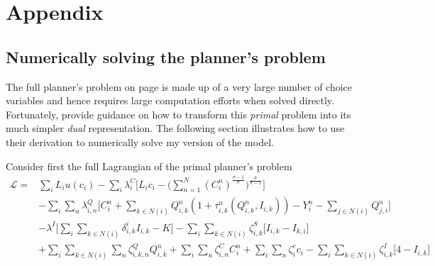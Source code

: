 \documentclass[11pt, oneside]{article}   	%
\begin{document}
  \section*{Appendix}

  \subsection{Numerically solving the planner's problem}
  \label{chapter:APP:math}


The full planner's problem on page \pageref{planner_problem} is made up of a very large number of choice variables and hence requires large computation efforts when solved directly. Fortunately, \cite{fajgelbaum_optimal_2017} provide guidance on how to transform this \emph{primal} problem into its much simpler \emph{dual} representation. The following section illustrates how to use their derivation to numerically solve my version of the model.

Consider first the full Lagrangian of the primal planner's problem
\begin{equation}
  \begin{aligned}
    \mathcal{L} ={} & \sum_{i}^{} L_{i}u(c_{i}) - \sum_{i}^{}\lambda^{C}_{i}\bigg[L_{i}c_{i} - \bigg( \sum_{n=1}^{N} (C_{i}^{n})^{\frac{\sigma-1}{\sigma}}\bigg)^{\frac{\sigma}{\sigma-1}} \bigg] \\
  & - \sum_{i}^{}\sum_{n}^{}\lambda^{Q}_{i,n}\bigg[ C_{i}^{n} + \sum_{k\in N(i)}^{}Q_{i,k}^{n}(1+\tau_{i,k}^{n}(Q_{i,k}^{n}, I_{i,k})) - Y_{i}^{n} - \sum_{j\in N(i)}^{}Q_{j,i}^{n} \bigg] \\
  & - \lambda^{I}\bigg[\sum_{i}^{}\sum_{k\in N(i)}^{}\delta^{i}_{i,k}I_{i,k} - K \bigg] - \sum_{i}^{}\sum_{k \in N(i)}^{}\zeta^{S}_{i,k}\bigg[ I_{i,k} - I_{k,i} \bigg] \\
  & + \sum_{i}^{}\sum_{k \in N(i)}^{}\sum_{n}^{} \zeta^{Q}_{i,k,n}Q_{i,k}^{n} + \sum_{i}^{}\sum_{n}^{} \zeta^{C}_{i,n}C_{i}^{n} + \sum_{i}^{}\sum_{n}^{} \zeta^{c}_{i}c_{i} - \sum_{i}^{}\sum_{k \in N(i)}^{} \zeta^{I}_{i,k}\bigg[4-I_{i,k}\bigg]
  \end{aligned}
\end{equation}
\end{document}
